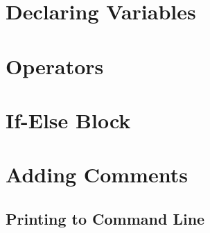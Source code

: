 \section{Declaring Variables}
\section{Operators}
\section{If-Else Block}
\section{Adding Comments}
\subsection{Printing to Command Line}